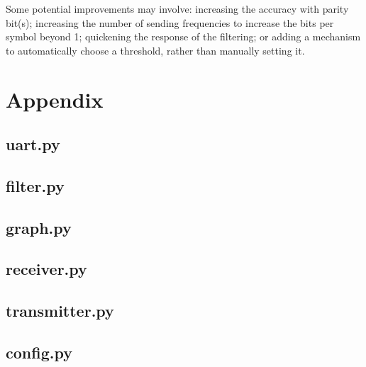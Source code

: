 \documentclass{article}
\begin{document}
\begin{multicols}{2}
Some potential improvements may involve: increasing the accuracy with parity bit(s); increasing the number of sending frequencies to increase the bits per symbol beyond 1; quickening the response of the filtering; or adding a mechanism to automatically choose a threshold, rather than manually setting it.  

\end{multicols}
\pagebreak

\section{Appendix}

\subsection{uart.py}


\subsection{filter.py}


\subsection{graph.py}


\subsection{receiver.py}


\subsection{transmitter.py}


\subsection{config.py}

\end{document}
